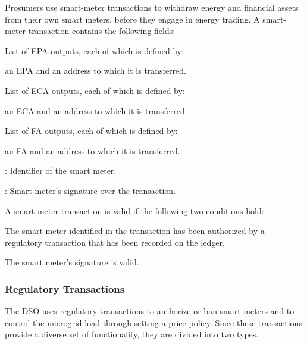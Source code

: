 Prosumers use smart-meter transactions to withdraw energy and financial assets from their own smart meters, before they engage in energy trading.
%
A smart-meter transaction contains the following fields:
\begin{compactitem}
\item List of EPA outputs, each of which is defined by:
\begin{compactitem}
\item an EPA and an address to which it is transferred.
\end{compactitem}
\item List of ECA outputs, each of which is defined by:
\begin{compactitem}
\item an ECA and an address to which it is transferred.
\end{compactitem}
\item List of FA outputs, each of which is defined by:
\begin{compactitem}
\item an FA and an address to which it is transferred.
\end{compactitem}
\item {}: Identifier of the smart meter.
\item {}: Smart meter's signature over the transaction.
\end{compactitem}

A smart-meter transaction is valid if the following two conditions hold:
\begin{compactitem}
\item The smart meter identified in the transaction has been authorized by a regulatory transaction that has been recorded on the ledger.
\item The smart meter's signature is valid.
\end{compactitem}

\subsubsection{Regulatory Transactions}

The DSO uses regulatory transactions to authorize or ban smart meters and to control the microgrid load through setting a price policy.
Since these transactions provide a diverse set of functionality, they are divided into two types.


